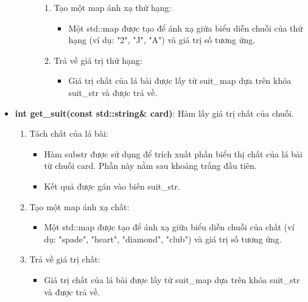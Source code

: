 \documentclass{article}
\begin{document}
\begin{itemize}
\begin{description}
\begin{enumerate}
            \item Tạo một map ánh xạ thứ hạng:
                \begin{itemize}
                    \item Một std::map được tạo để ánh xạ giữa biểu diễn chuỗi của thứ hạng (ví dụ: "2", "J", "A") và giá trị số tương ứng.
                \end{itemize}
            \item Trả về giá trị thứ hạng:
                \begin{itemize}
                    \item Giá trị chất của lá bài được lấy từ suit\_map dựa trên khóa suit\_str và được trả về.
                \end{itemize}
        \end{enumerate}
    \end{description}
    
    \item \textbf{int get\_suit(const std::string\& card)}: Hàm lấy giá trị chất của chuỗi.
    \begin{description}
            \begin{enumerate}
            \item Tách chất của lá bài:
                \begin{itemize}
                    \item Hàm substr được sử dụng để trích xuất phần biểu thị chất của lá bài từ chuỗi card. Phần này nằm sau khoảng trắng đầu tiên.
                    \item Kết quả được gán vào biến suit\_str.
                \end{itemize}
            \item Tạo một map ánh xạ chất:
                \begin{itemize}
                    \item Một std::map được tạo để ánh xạ giữa biểu diễn chuỗi của chất (ví dụ: "spade", "heart", "diamond", "club") và giá trị số tương ứng.
                \end{itemize}
            \item Trả về giá trị chất:
                \begin{itemize}
                    \item Giá trị chất của lá bài được lấy từ suit\_map dựa trên khóa suit\_str và được trả về.
                \end{itemize}
        \end{enumerate}
    \end{description}


\end{itemize}
\end{document}
